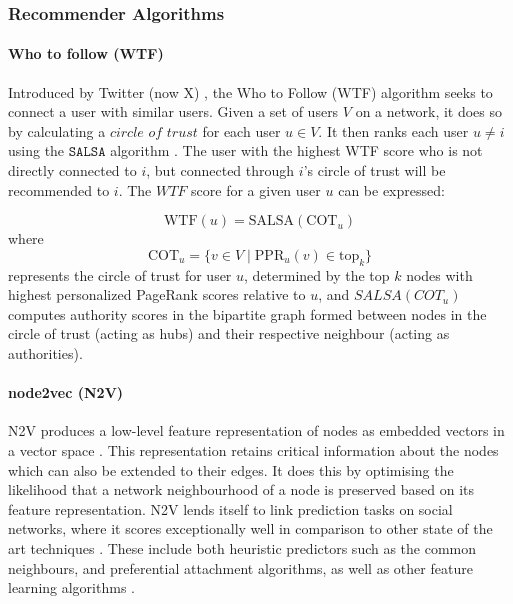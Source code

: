 \documentclass[unnumsec,webpdf,contemporary,large]{oup-authoring-template}%
\theoremstyle{thmstyleone}%
\theoremstyle{thmstyletwo}%
\theoremstyle{thmstylethree}%
\begin{document}
\subsubsection{Recommender Algorithms}\label{sec:recommenderalgs}

\paragraph{Who to follow (WTF)}

Introduced by Twitter (now X) \cite{gupta_wtf_2013}, the Who to Follow (WTF) algorithm seeks to connect a user with similar users. Given a set of users $V$ on a network, it does so by calculating a $\textit{circle of trust}$ for each user $u \in V$. It then ranks each user $u \neq i$ using the $\texttt{SALSA}$ algorithm \cite{lempelSALSAStochasticApproach2001}. The user with the highest WTF score who is not directly connected to $i$, but connected through $i$'s circle of trust will be recommended to $i$. The $WTF$ score for a given user $u$ can be expressed:

\begin{equation}
\text{WTF}(u) = \text{SALSA}(\text{COT}_u)
\end{equation}
where
\begin{equation}
\text{COT}_u = \{v \in V \mid \text{PPR}_u(v) \in \text{top}_k\}
\end{equation}
represents the circle of trust for user $u$, determined by the top $k$ nodes with highest personalized PageRank scores relative to $u$, and $SALSA(COT_u)$ computes authority scores in the bipartite graph formed between nodes in the circle of trust (acting as hubs) and their respective neighbour (acting as authorities).


\paragraph{node2vec (N2V)}

N2V produces a low-level feature representation of nodes as embedded vectors in a vector space \cite{grover_node2vec_2016}. This representation retains critical information about the nodes which can also be extended to their edges. It does this by optimising the likelihood that a network neighbourhood of a node is preserved based on its feature representation. N2V lends itself to link prediction tasks on social networks, where it scores exceptionally well in comparison to other state of the art techniques \cite{saxena_nodesim_2022}. These include both heuristic predictors such as the common neighbours, and preferential attachment algorithms, as well as other feature learning algorithms \cite{grover_node2vec_2016}.
\end{document}
